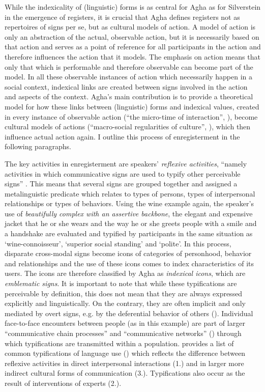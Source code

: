 While the indexicality of (linguistic) forms is as central for Agha as for Silverstein in the emergence of registers, it is crucial that Agha defines registers not as repertoires of signs per se, but as cultural models of action. A model of action is only an abstraction of the actual, observable action, but it is necessarily based on that action and serves as a point of reference for all participants in the action and therefore influences the action that it models. The emphasis on action means that only that which is performable and therefore observable can become part of the model. In all these observable instances of action which necessarily happen in a social context, indexical links are created between signs involved in the action and aspects of the context. Agha’s main contribution is to provide a theoretical model for how these links between (linguistic) forms and indexical values, created in every instance of observable action (“the micro-time of interaction”, \citeyear[103]{Agha2007}), become cultural models of actions (“macro-social regularities of culture”, \citeyear[103]{Agha2007}), which then influence actual action again. I outline this process of enregisterment in the following paragraphs.



The key activities in enregisterment are speakers’ \textit{reflexive activities}, “namely activities in which communicative signs are used to typify other perceivable signs” \citep[16]{Agha2007}. This means that several signs are grouped together and assigned a metalinguistic predicate which relates to types of persons, types of interpersonal relationships or types of behaviors. Using the wine example again, the speaker’s use of \emph{beautifully complex with an assertive backbone}, the elegant and expensive jacket that he or she wears and the way he or she greets people with a smile and a handshake are evaluated and typified by participants in the same situation as ‘wine-connoisseur’, ‘superior social standing’ and ‘polite’. In this process, disparate cross-modal signs become icons of categories of personhood, behavior and relationships and the use of these icons comes to index characteristics of its users. The icons are therefore classified by Agha as \textit{indexical icons}, which are \textit{emblematic signs}. It is important to note that while these typifications are perceivable by definition, this does not mean that they are always expressed explicitly and linguistically. On the contrary, they are often implicit and only mediated by overt signs, e.g. by the deferential behavior of others (\citeyear[103]{Agha2007}). Individual face-to-face encounters between people (as in this example) are part of larger “communicative chain processes” and “communicative networks” (\citeyear[69]{Agha2007}) through which typifications are transmitted within a population. \citet[151]{Agha2007} provides a list of common typifications of language use () which reflects the difference between reflexive activities in direct interpersonal interactions (1.) and in larger more indirect cultural forms of communication (3.). Typifications also occur as the result of interventions of experts (2.).


